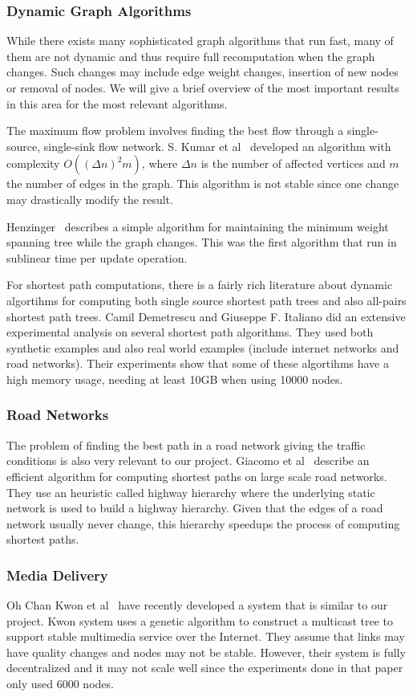 \subsubsection{Dynamic Graph Algorithms}

While there exists many sophisticated graph algorithms that run fast, many of them are not dynamic and thus require full recomputation when the graph changes. Such changes may include edge weight changes, insertion of new nodes or removal of nodes. We will give a brief overview of the most important results in this area for the most relevant algorithms.

The maximum flow problem involves finding the best flow through a single-source, single-sink flow network.
S. Kumar et al~\cite{maxflow} developed an algorithm with complexity $O((\Delta n)^{2}m)$, where $\Delta n$ is the number of affected vertices and $m$ the number of edges in the graph. This algorithm is not stable since one change may drastically modify the result.

Henzinger~\cite{Henzinger97maintainingminimum} describes a simple algorithm for maintaining the minimum weight spanning tree while the graph changes. This was the first algorithm that run in sublinear time per update operation.

For shortest path computations, there is a fairly rich literature about dynamic algortihms for computing both single source shortest path trees and also all-pairs shortest path trees. Camil Demetrescu and Giuseppe F. Italiano did an extensive experimental analysis \cite{Demetrescu04experimentalanalysis} on several shortest path algorithms. They used both synthetic examples and also real world examples (include internet networks and road networks). Their experiments show that some of these algortihms have a high memory usage, needing at least 10GB when using 10000 nodes.

\subsubsection{Road Networks}

The problem of finding the best path in a road network giving the traffic conditions is also very relevant to our project.
Giacomo et al~\cite{DBLP:journals/corr/abs-0704-1068} describe an efficient algorithm for computing shortest paths on large scale road networks. They use an heuristic called highway hierarchy where the underlying static network is used to build a highway hierarchy. Given that the edges of a road network usually never change, this hierarchy speedups the process of computing shortest paths.

\subsubsection{Media Delivery}

Oh Chan Kwon et al~\cite{51043858} have recently developed a system that is similar to our project. Kwon system uses a genetic algorithm to construct a multicast tree to support stable multimedia service over the Internet. They assume that links may have quality changes and nodes may not be stable. However, their system is fully decentralized and it may not scale well
since the experiments done in that paper only used 6000 nodes.
